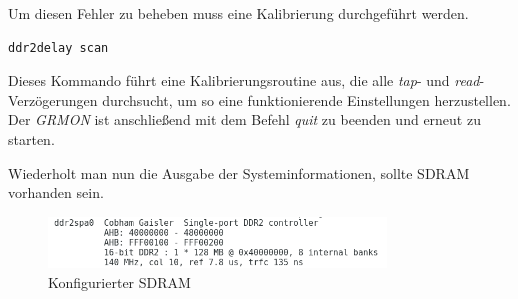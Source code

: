 Um diesen Fehler zu beheben muss eine Kalibrierung durchgeführt werden.\\

\begin{lstlisting}[caption={Starten der Routine},label={code:ddr2delay}]
ddr2delay scan
   \end{lstlisting}


Dieses Kommando führt eine Kalibrierungsroutine aus, die alle \emph{tap}- und \emph{read}-Verzögerungen durchsucht, um so eine funktionierende Einstellungen herzustellen.\\

Der \emph{GRMON} ist anschließend mit dem Befehl \emph{quit} zu beenden und erneut zu starten.

Wiederholt man nun die Ausgabe der Systeminformationen, sollte SDRAM vorhanden sein.

\begin{figure}[h!]
\centering
\includegraphics[width=0.8\textwidth]{Hauptteil/sdram.png}
\caption{Konfigurierter SDRAM}
\label{fig:sdram}
\end{figure}



